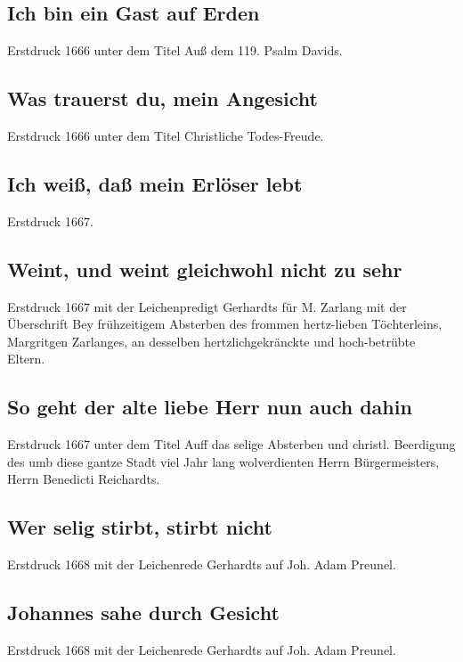 \subsection*{ Ich bin ein Gast auf Erden}

Erstdruck 1666 unter dem Titel \frqq Auß dem 119. Psalm Davids\flqq .

\subsection*{ Was trauerst du, mein Angesicht}

Erstdruck 1666 unter dem Titel \frqq Christliche Todes-Freude\flqq .

\subsection*{ Ich weiß, daß mein Erlöser lebt}

Erstdruck 1667.

\subsection*{ Weint, und weint gleichwohl nicht zu sehr}

Erstdruck 1667 mit der Leichenpredigt Gerhardts für M. Zarlang mit der
Überschrift \frqq Bey frühzeitigem Absterben des frommen hertz-lieben
Töchterleins, Margritgen Zarlanges, an desselben hertzlichgekränckte und
hoch-betrübte Eltern\flqq .

\subsection*{ So geht der alte liebe Herr nun auch dahin}

Erstdruck 1667 unter dem Titel \frqq Auff das selige Absterben und christl.
Beerdigung des umb diese gantze Stadt viel Jahr lang wolverdienten Herrn
Bürgermeisters, Herrn Benedicti Reichardts\flqq .

\subsection*{ Wer selig stirbt, stirbt nicht}

Erstdruck 1668 mit der Leichenrede Gerhardts auf Joh. Adam Preunel.

\subsection*{ Johannes sahe durch Gesicht}

Erstdruck 1668 mit der Leichenrede Gerhardts auf Joh. Adam Preunel.

